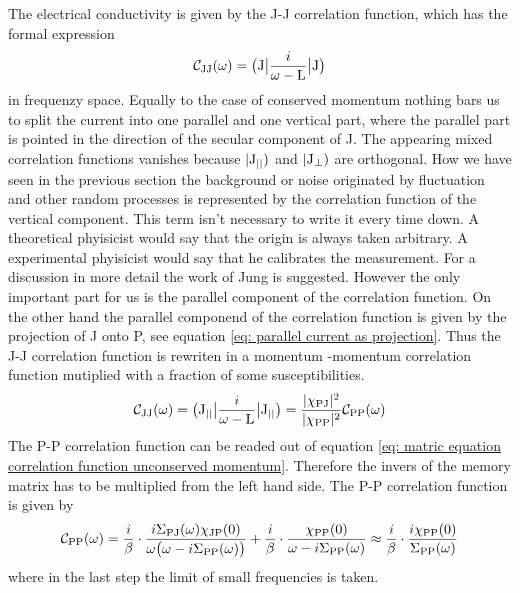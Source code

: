 The electrical conductivity is given by the J-J correlation function, which has the formal expression
%
\begin{align}
	\mathcal{C}_{\mathrm{JJ}}(\omega) = \big({\mathrm{J}}\big| \frac{i}{\omega - \mathrm{L}} \big|{\mathrm{J}}\big)
\end{align}
%
in frequenzy space.
Equally to the case of conserved momentum nothing bars us to split the current into one parallel and one vertical part, where the parallel part is pointed in the direction of the secular component of J.
The appearing mixed correlation functions vanishes because $|\mathrm{\mathrm{J}_{\mid\mid}})$ and $|\mathrm{\mathrm{J}_{\bot}})$ are orthogonal.
How we have seen in the previous section the background or noise originated by fluctuation and other random processes is represented by the correlation function of the vertical component.
This term isn't necessary to write it every time down.
A theoretical phyisicist would say that the origin is always taken arbitrary.
A experimental phyisicist would say that he calibrates the measurement.
For a discussion in more detail the work of Jung \cite{Jung} is suggested.
However the only important part for us is the parallel component of the correlation function.
On the other hand the parallel componend of the correlation function is given by the projection of J onto P, see equation \eqref{eq: parallel current as projection}.
Thus the J-J correlation function is rewriten in a momentum -momentum correlation function mutiplied with a fraction of some susceptibilities.
%
\begin{align}
	\mathcal{C}_{\mathrm{JJ}}(\omega) = \big({\mathrm{J}_{\mid\mid}}\big| \frac{i}{\omega - \mathrm{L}} \big|{\mathrm{J}_{\mid\mid}}\big) = \frac{\vert\chi_{\mathrm{PJ}}\vert^{2}}{\vert\chi_{\mathrm{PP}}\vert^{2}} \mathcal{C}_{\mathrm{PP}}(\omega)
\end{align}
%
The P-P correlation function can be readed out of equation \eqref{eq: matric equation correlation function unconserved momentum}.
Therefore the invers of the memory matrix has to be multiplied from the left hand side.
The P-P correlation function is given by
%
\begin{align}
	\mathcal{C}_{\mathrm{PP}}(\omega) = \frac{i}{\beta} \cdot \frac{i \Sigma_{\mathrm{PJ}}(\omega)  \chi_{\mathrm{JP}}(0)}{\omega\big(\omega - i\Sigma_{\mathrm{PP}}(\omega)\big)} + \frac{i}{\beta} \cdot \frac{\chi_{\mathrm{PP}}(0)}{\omega - i\Sigma_{\mathrm{PP}}(\omega)} \approx \frac{i}{\beta} \cdot \frac{i \chi_{\mathrm{PP}}(0)}{\Sigma_{\mathrm{PP}}(\omega)}
\end{align}
%
where in the last step the limit of small frequencies is taken.
